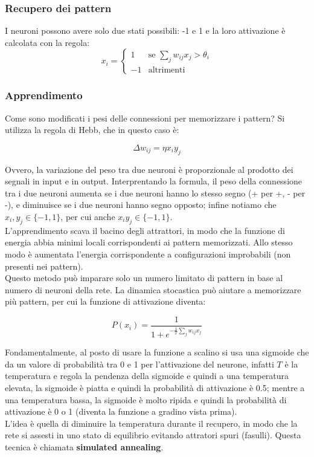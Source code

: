 \subsubsection{Recupero dei pattern}
I neuroni possono avere solo due stati possibili: -1 e 1 e la loro attivazione è
calcolata con la regola:
\begin{equation*}
	x_i = \begin{cases}
		1 & \text{se } \sum_{j} w_{ij} x_j > \theta_i\\
		-1 & \text{altrimenti}
	\end{cases}
\end{equation*}

\subsubsection{Apprendimento}

Come sono modificati i pesi delle connessioni per memorizzare i pattern? Si
utilizza la regola di Hebb, che in questo caso è:

\begin{equation*}
	\Delta w_{ij} = \eta x_i y_j
\end{equation*}

Ovvero, la variazione del peso tra due neuroni è proporzionale al prodotto dei 
segnali in input e in output. Interprentando la formula, il peso della
connessione tra i due neuroni aumenta se i due neuroni hanno lo stesso segno (+
per +, - per -), e diminuisce se i due neuroni hanno segno opposto; infine
notiamo che $x_i, y_j \in \{-1, 1\}$, per cui anche $x_i y_j \in \{-1, 1\}$.\\
L'apprendimento scava il bacino degli attrattori, in modo che
la funzione di energia abbia minimi locali corrispondenti ai pattern memorizzati.
Allo stesso modo è aumentata l'energia corrispondente a configurazioni
improbabili (non presenti nei pattern).\\
Questo metodo può imparare solo un numero limitato di pattern in base al numero
di neuroni della rete. La dinamica stocastica può aiutare a memorizzare più
pattern, per cui la funzione di attivazione diventa:

\begin{equation*}
	P(x_i) = \frac{1}{1 + e^{-\frac{1}{T} \sum_{j} w_{ij} x_j}}
\end{equation*}

Fondamentalmente, al posto di usare la funzione a scalino si usa una sigmoide
che da un valore di probabilità tra 0 e 1 per l'attivazione del neurone, infatti
$T$ è la temperatura e regola la pendenza della sigmoide e quindi a una
temperatura elevata, la sigmoide è piatta e quindi la probabilità di attivazione
è 0.5; mentre a una temperatura bassa, la sigmoide è molto ripida e quindi la
probabilità di attivazione è 0 o 1 (diventa la funzione a gradino vista prima).\\
L'idea è quella di diminuire la temperatura durante il recupero, in modo che la
rete si assesti in uno stato di equilibrio evitando attratori spuri (fasulli).
Questa tecnica è chiamata \textbf{simulated annealing}.

